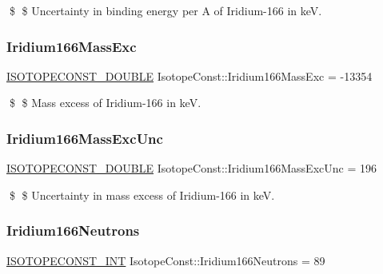 \$ \$ Uncertainty in binding energy per A of Iridium-\/166 in keV. \mbox{\label{group___isotope_const-_iridium-_ir166_gacaeadd701a5b8f15d6abbfcaf42672c8}} 
\subsubsection{\texorpdfstring{Iridium166\+Mass\+Exc}{Iridium166MassExc}}
{\footnotesize\ttfamily \mbox{\hyperlink{group___isotope_const-_macros_ga8f45a7272ce02c0b4c65c44636ed719a}{I\+S\+O\+T\+O\+P\+E\+C\+O\+N\+S\+T\+\_\+\+D\+O\+U\+B\+LE}} Isotope\+Const\+::\+Iridium166\+Mass\+Exc = -\/13354}

\$ \$ Mass excess of Iridium-\/166 in keV. \mbox{\label{group___isotope_const-_iridium-_ir166_ga2327379bc8d497e337a7560f09c15271}} 
\subsubsection{\texorpdfstring{Iridium166\+Mass\+Exc\+Unc}{Iridium166MassExcUnc}}
{\footnotesize\ttfamily \mbox{\hyperlink{group___isotope_const-_macros_ga8f45a7272ce02c0b4c65c44636ed719a}{I\+S\+O\+T\+O\+P\+E\+C\+O\+N\+S\+T\+\_\+\+D\+O\+U\+B\+LE}} Isotope\+Const\+::\+Iridium166\+Mass\+Exc\+Unc = 196}

\$ \$ Uncertainty in mass excess of Iridium-\/166 in keV. \mbox{\label{group___isotope_const-_iridium-_ir166_gafb732e05754b42de4b408d5a900c5162}} 
\subsubsection{\texorpdfstring{Iridium166\+Neutrons}{Iridium166Neutrons}}
{\footnotesize\ttfamily \mbox{\hyperlink{group___isotope_const-_macros_ga5f18360b3e99483a35c32d789e62621c}{I\+S\+O\+T\+O\+P\+E\+C\+O\+N\+S\+T\+\_\+\+I\+NT}} Isotope\+Const\+::\+Iridium166\+Neutrons = 89}

